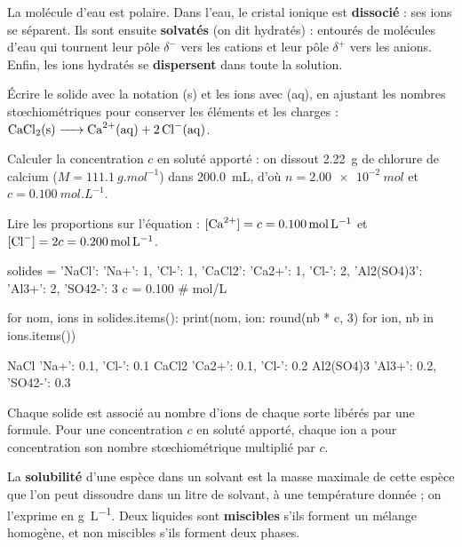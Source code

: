 \begin{propriete}
La molécule d'eau est polaire. Dans l'eau, le cristal ionique est \textbf{dissocié} : ses ions se séparent. Ils sont ensuite
\textbf{solvatés} (on dit hydratés) : entourés de molécules d'eau qui tournent leur pôle $\delta^{-}$ vers les cations et leur pôle $\delta^{+}$
vers les anions. Enfin, les ions hydratés se \textbf{dispersent} dans toute la solution.
\end{propriete}
\begin{savoirfaire}
\begin{questions}
\item Écrire le solide avec la notation (s) et les ions avec (aq), en ajustant les nombres stœchiométriques pour conserver
les éléments et les charges : $\ce{CaCl2(s) -> Ca^{2+}(aq) + 2Cl^{-}(aq)}$.
\item Calculer la concentration $c$ en soluté apporté : on dissout \qty{2,22}{g} de chlorure de calcium ($M=\qty{111,1}{g.mol^{-1}}$) dans
\qty{200,0}{mL}, d'où $n=\qty{2,00e-2}{mol}$ et $c=\qty{0,100}{mol.L^{-1}}$.
\item Lire les proportions sur l'équation : $[\ce{Ca^{2+}}]=c=\qty{0,100}{mol.L^{-1}}$ et $[\ce{Cl-}]=2c=\qty{0,200}{mol.L^{-1}}$.
\end{questions}
\end{savoirfaire}
\begin{python}
solides = {'NaCl': {'Na+': 1, 'Cl-': 1},
           'CaCl2': {'Ca2+': 1, 'Cl-': 2},
           'Al2(SO4)3': {'Al3+': 2, 'SO42-': 3}}
c = 0.100      # mol/L

for nom, ions in solides.items():
    print(nom, {ion: round(nb * c, 3) for ion, nb in ions.items()})
\end{python}
\begin{console}
NaCl {'Na+': 0.1, 'Cl-': 0.1}
CaCl2 {'Ca2+': 0.1, 'Cl-': 0.2}
Al2(SO4)3 {'Al3+': 0.2, 'SO42-': 0.3}
\end{console}
\noindent{} Chaque solide est associé au nombre d'ions de chaque sorte libérés par une formule. Pour une
concentration $c$ en soluté apporté, chaque ion a pour concentration son nombre stœchiométrique multiplié par $c$.
\begin{definition}[Solubilité]
La \textbf{solubilité} d'une espèce dans un solvant est la masse maximale de cette espèce que l'on peut dissoudre dans un
litre de solvant, à une température donnée ; on l'exprime en \unit{g.L^{-1}}. Deux liquides sont \textbf{miscibles} s'ils forment
un mélange homogène, et non miscibles s'ils forment deux phases.
\end{definition}
